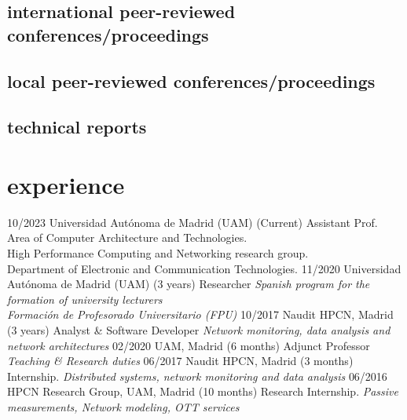 \documentclass[]{friggeri-cv}
\begin{document}
\subsection{international peer-reviewed conferences/proceedings}
\begin{refsegment}
  \nocite{*}
  \printbibliography[sorting=chronological, type=inproceedings, notkeyword={spanish}, heading=none]
\end{refsegment}
\subsection{local peer-reviewed conferences/proceedings}
\begin{refsegment}
  \nocite{*}
  \printbibliography[sorting=chronological, type=inproceedings, keyword={spanish}, heading=none]
\end{refsegment}
\subsection{technical reports}
\begin{refsegment}
  \nocite{*}
  \printbibliography[sorting=chronological, type=report, heading=none]
\end{refsegment}

\section{experience}

\begin{entrylist}
\entry
    {10/2023}
    {Universidad Autónoma de Madrid (UAM) \hspace{1em} (Current) }
    {Assistant Prof.}
    {Area of Computer Architecture and Technologies. \\
    High Performance Computing and Networking research group.\\
    Department of Electronic and Communication Technologies.
    }
\entry
    {11/2020}
    {Universidad Autónoma de Madrid (UAM) \hspace{1em} (3 years) }
    {Researcher}
    {\emph{Spanish program for the formation of university lecturers \\
    Formación de Profesorado Universitario (FPU)}}
  \entry
    {10/2017}
    {Naudit HPCN, Madrid \hspace{1em} (3 years) }
    {Analyst \& Software Developer}
    {\emph{Network monitoring, data analysis and network architectures}}
\entry
    {02/2020}
    {UAM, Madrid \hspace{1em} (6 months) }
    {Adjunct Professor}
    {\emph{Teaching \& Research duties}}
\entry
    {06/2017}
    {Naudit HPCN, Madrid \hspace{1em} (3 months)}
    {Internship.}
    {\emph{Distributed systems, network monitoring and data analysis}}
    \entry
    {06/2016}
    {HPCN Research Group, UAM, Madrid \hspace{1em} (10 months) }
    {Research Internship.}
    {\emph{Passive measurements, Network modeling, OTT services}}{}
 
\end{entrylist}
\end{document}
